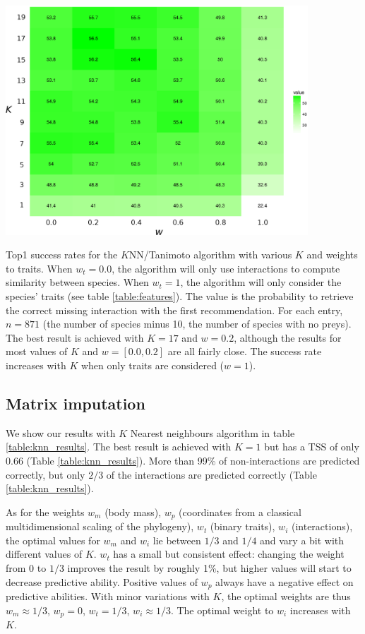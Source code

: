 \documentclass[letterpaper]{article}
\begin{document}
\begin{table}
  \centering\includegraphics[width=0.85\textwidth]{knn-heatmap.eps}

  \caption{Top1 success rates for the $K$NN/Tanimoto algorithm with various
  $K$ and weights to traits. When $w_t = 0.0$, the algorithm will only use
  interactions to compute similarity between species. When $w_t = 1$, the
  algorithm will only consider the species' traits (see table
  \ref{table:features}). The value is the probability to retrieve the correct
  missing interaction with the first recommendation. For each entry, $n = 871$
  (the number of species minus 10, the number of species with no preys). The
  best result is achieved with $K = 17$ and $w = 0.2$, although the results
  for most values of $K$ and $w = [0.0, 0.2]$ are all fairly close. The
  success rate increases with $K$ when only traits are considered ($w = 1$).}

  \label{table:tanimoto_k_weights}
\end{table}

\subsection{Matrix imputation}

We show our results with $K$ Nearest neighbours algorithm in table
\ref{table:knn_results}. The best result is achieved with $K = 1$ but has a TSS
of only 0.66 (Table \ref{table:knn_results}). More than 99\% of
non-interactions are predicted correctly, but only $2/3$ of the interactions
are predicted correctly (Table \ref{table:knn_results}).

As for the weights $w_m$ (body mass), $w_p$ (coordinates from a classical
multidimensional scaling of the phylogeny), $w_t$ (binary traits), $w_i$
(interactions), the optimal values for $w_m$ and $w_i$ lie between $1/3$ and
$1/4$ and vary a bit with different values of $K$. $w_t$ has a small but
consistent effect: changing the weight from 0 to $1/3$ improves the result by
roughly 1\%, but higher values will start to decrease predictive ability.
Positive values of $w_p$ always have a negative effect on predictive abilities.
With minor variations with $K$, the optimal weights are thus $w_m \approx 1 /
3$, $w_p = 0$, $w_t = 1 / 3$, $w_i \approx 1 / 3$. The optimal
weight to $w_i$ increases with $K$.
\end{document}
